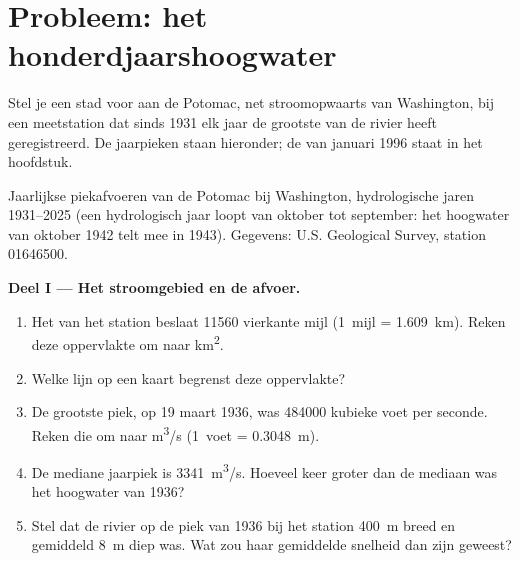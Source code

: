 \section{Probleem: het honderdjaarshoogwater}

\begin{problem}
\label{pb:g10:drainage-basins:1}
Stel je een stad voor aan de Potomac, net stroomopwaarts van Washington, bij een
meetstation dat sinds 1931 elk jaar de grootste  van de rivier heeft
geregistreerd. De jaarpieken staan hieronder; de  van januari 1996
staat in het hoofdstuk.

\begin{center}

{\small Jaarlijkse piekafvoeren van de Potomac bij Washington, hydrologische
jaren 1931--2025 (een hydrologisch jaar loopt van oktober tot september: het
hoogwater van oktober 1942 telt mee in 1943). Gegevens: U.S. Geological Survey,
station 01646500.}
\end{center}

\medskip
\noindent\textbf{Deel I --- Het stroomgebied en de afvoer.}
\begin{enumerate}
  \item Het  van het station beslaat \num{11560} vierkante mijl
        (\num{1}~mijl = \qty{1.609}{km}). Reken deze oppervlakte om naar
        \unit{km^2}.
  \item Welke lijn op een kaart begrenst deze oppervlakte?
  \item De grootste piek, op 19 maart 1936, was \num{484000} kubieke voet per
        seconde. Reken die om naar \unit{m^3/s} (\num{1}~voet =
        \qty{0.3048}{m}).
  \item De mediane jaarpiek is \qty{3341}{m^3/s}. Hoeveel keer groter dan de
        mediaan was het hoogwater van 1936?
  \item Stel dat de rivier op de piek van 1936 bij het station \qty{400}{m}
        breed en gemiddeld \qty{8}{m} diep was. Wat zou haar gemiddelde
        snelheid dan zijn geweest?
\end{enumerate}


\end{problem}
